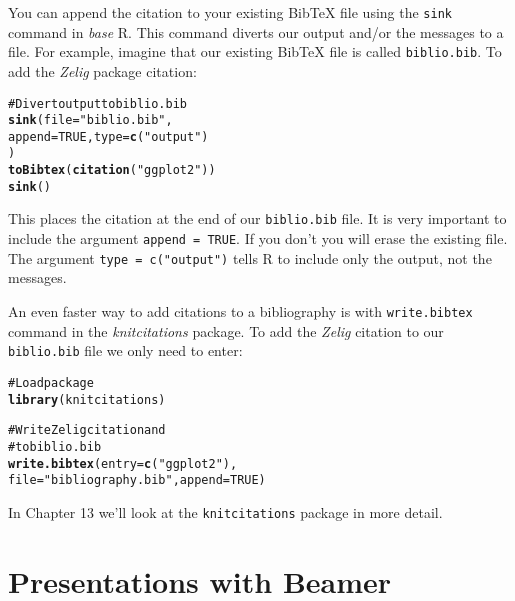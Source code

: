 \documentclass[ChapterTOCs,krantz1]{krantz}\usepackage{graphicx, color}
\makeatletter
\newcommand{\hlfunctioncall}[1]{\textcolor[rgb]{0.501960784313725,0,0.329411764705882}{\textbf{#1}}}%
\newcommand{\hlstring}[1]{\textcolor[rgb]{0.6,0.6,1}{#1}}%
\newcommand{\hlcomment}[1]{\textcolor[rgb]{0.180392156862745,0.6,0.341176470588235}{#1}}%
\newenvironment{kframe}{%
 \def\at@end@of@kframe{}%
 \ifinner\ifhmode%
  \def\at@end@of@kframe{\end{minipage}}%
  \begin{minipage}{\columnwidth}%
 \fi\fi%
 \def\FrameCommand##1{\hskip\@totalleftmargin \hskip-\fboxsep
 \colorbox{shadecolor}{##1}\hskip-\fboxsep
     \hskip-\linewidth \hskip-\@totalleftmargin \hskip\columnwidth}%
 \MakeFramed {\advance\hsize-\width
   \@totalleftmargin\z@ \linewidth\hsize
   \@setminipage}}%
 {\par\unskip\endMakeFramed%
 \at@end@of@kframe}
\newenvironment{knitrout}{}{} %
\makeatother
\begin{document}
\noindent You can append the citation to your existing BibTeX file using the \texttt{sink} command in \emph{base} R. This command diverts our output and/or the messages to a file. For example, imagine that our existing BibTeX file is called \texttt{biblio.bib}. To add the \emph{Zelig} package citation:

\begin{knitrout}
\color{fgcolor}\begin{kframe}
\begin{alltt}
\hlcomment{# Divert output to biblio.bib}
\hlfunctioncall{sink}(file = \hlstring{"biblio.bib"}, 
     append = TRUE, type = \hlfunctioncall{c}(\hlstring{"output"})
     )      
\hlfunctioncall{toBibtex}(\hlfunctioncall{citation}(\hlstring{"ggplot2"})) 
\hlfunctioncall{sink}()
\end{alltt}
\end{kframe}
\end{knitrout}


\noindent This places the citation at the end of our \texttt{biblio.bib} file. It is very important to include the argument \texttt{append = TRUE}. If you don't you will erase the existing file. The argument \texttt{type = c("output")} tells R to include only the output, not the messages.

An even faster way to add citations to a bibliography is with \texttt{write.bibtex} command in the \emph{knitcitations} package. To add the \emph{Zelig} citation to our \texttt{biblio.bib} file we only need to enter:

\begin{knitrout}
\color{fgcolor}\begin{kframe}
\begin{alltt}
\hlcomment{# Load package}
\hlfunctioncall{library}(knitcitations)
 
\hlcomment{# Write Zelig citation and}
\hlcomment{# to biblio.bib}
\hlfunctioncall{write.bibtex}(entry = \hlfunctioncall{c}(\hlstring{"ggplot2"}), 
              file = \hlstring{"bibliography.bib"}, append = TRUE)
\end{alltt}
\end{kframe}
\end{knitrout}


\noindent In Chapter 13 we'll look at the \texttt{knitcitations} package in more detail.

\section{Presentations with Beamer}
\end{document}
